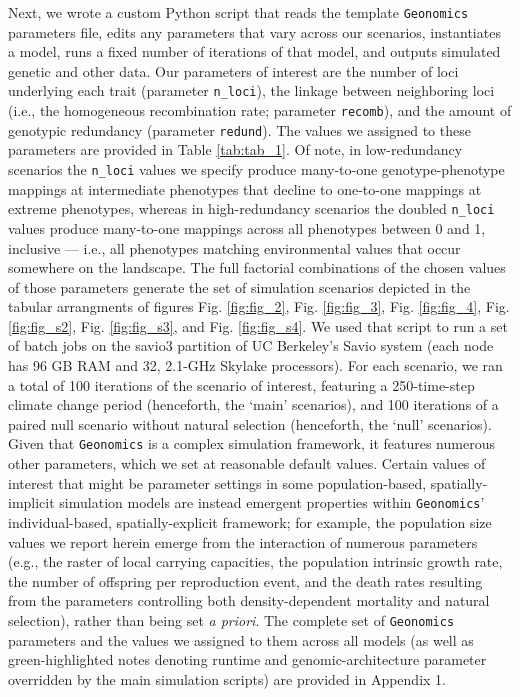 \documentclass[9pt,twocolumn,twoside,lineno]{pnas-new}
\begin{document}
{Next, we wrote a custom Python script that reads the template \texttt{Geonomics}
parameters file, edits any parameters that vary 
across our scenarios, instantiates a model, runs a fixed number of iterations 
of that model, and outputs simulated genetic and other data. 
Our parameters of interest are the number of loci underlying
each trait (parameter \texttt{n\_loci}),
the linkage between neighboring loci
(i.e., the homogeneous recombination rate; parameter \texttt{recomb}),
and the amount of genotypic redundancy (parameter \texttt{redund}).
The values we assigned to these parameters are provided in Table \ref{tab:tab_1}.
Of note, in low-redundancy scenarios the \texttt{n\_loci} values we specify
produce many-to-one genotype-phenotype mappings at intermediate phenotypes
that decline to one-to-one mappings at extreme phenotypes,
whereas in high-redundancy scenarios the doubled \texttt{n\_loci} values
produce many-to-one mappings across all phenotypes between 0 and 1, inclusive
--- i.e., all phenotypes matching environmental values
that occur somewhere on the landscape.
The full factorial combinations of the chosen values of those parameters generate the set
of simulation scenarios depicted in the tabular arrangments of figures
Fig. \ref{fig:fig_2}, Fig. \ref{fig:fig_3}, Fig. \ref{fig:fig_4}, Fig. \ref{fig:fig_s2}, Fig. \ref{fig:fig_s3}, and Fig. \ref{fig:fig_s4}.
We used that script to run a set of batch jobs on the 
savio3 partition of UC Berkeley’s Savio system (each node has 96 GB RAM and 32, 
2.1-GHz Skylake processors). For each scenario, we ran a total of 100 iterations of 
the scenario of interest, featuring a 250-time-step climate change period (henceforth, 
the ‘main’ scenarios), and 100 iterations of a paired null scenario without natural 
selection (henceforth, the ‘null’ scenarios). 
Given that \texttt{Geonomics} is a complex simulation framework, it features numerous other 
parameters, which we set at reasonable default values.
Certain values of interest that might be parameter settings in
some population-based, spatially-implicit simulation models are instead
emergent properties within \texttt{Geonomics}' individual-based, spatially-explicit
framework; for example, the population size values we report herein emerge from the interaction
of numerous parameters (e.g., the raster of local carrying capacities,
the population intrinsic growth rate, the number of offspring per reproduction event,
and the death rates resulting from the parameters controlling both density-dependent mortality
and natural selection), rather than being set \textit{a priori}.
The complete set of \texttt{Geonomics} parameters and the values 
we assigned to them across all models
(as well as green-highlighted notes denoting runtime and genomic-architecture
parameter overridden by the main simulation scripts)
are provided in Appendix 1.

}
\end{document}

